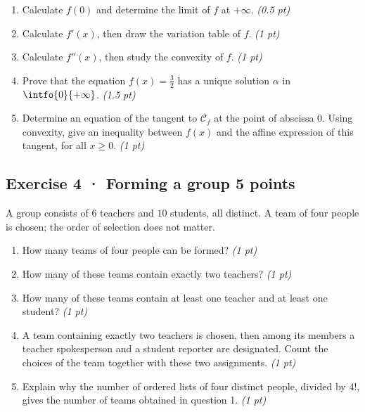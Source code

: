 \begin{enumerate}

\item Calculate $f(0)$ and determine the limit of $f$ at $+\infty$. \hfill\textit{(0.5 pt)}

\item Calculate $f' (x)$, then draw the variation table of $f$. \hfill\textit{(1 pt)}

\item Calculate $f'' (x)$, then study the convexity of $f$. \hfill\textit{(1 pt)}

\item Prove that the equation $f(x)=\frac{3}{2}$ has a unique solution $\alpha$ in $\intfo{0}{+\infty}$. \hfill\textit{(1.5 pt)}

\item Determine an equation of the tangent to $\mathcal C_f$ at the point of abscissa $0$. Using convexity, give an inequality between $f(x)$ and the affine expression of this tangent, for all $x\ge0$. \hfill\textit{(1 pt)}

\end{enumerate}

\subsection*{Exercise 4 · Forming a group \hfill 5 points}A group consists of $6$ teachers and $10$ students, all distinct. A team of four people is chosen; the order of selection does not matter.

\begin{enumerate}

\item How many teams of four people can be formed? \hfill\textit{(1 pt)}

\item How many of these teams contain exactly two teachers? \hfill\textit{(1 pt)}

\item How many of these teams contain at least one teacher and at least one student? \hfill\textit{(1 pt)}

\item A team containing exactly two teachers is chosen, then among its members a teacher spokesperson and a student reporter are designated. Count the choices of the team together with these two assignments. \hfill\textit{(1 pt)}

\item Explain why the number of ordered lists of four distinct people, divided by $4!$, gives the number of teams obtained in question 1. \hfill\textit{(1 pt)}

\end{enumerate}

